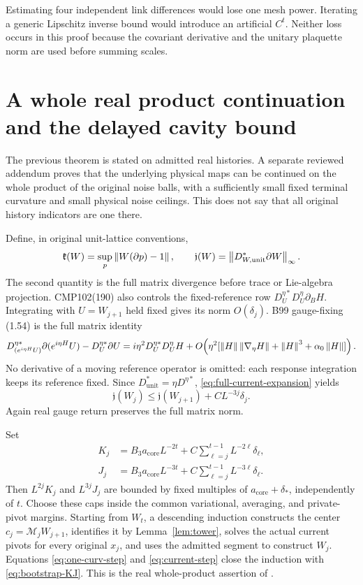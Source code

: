 Estimating four independent link differences would lose one mesh power. Iterating a generic Lipschitz inverse bound would introduce an artificial $C^t$. Neither loss occurs in this proof because the covariant derivative and the unitary plaquette norm are used before summing scales.

\section{A whole real product continuation and the delayed cavity bound}
\label{sec:whole-product}

The previous theorem is stated on admitted real histories. A separate reviewed addendum proves that the underlying physical maps can be continued on the whole product of the original noise balls, with a sufficiently small fixed terminal curvature and small physical noise ceilings. This does not say that all original history indicators are one there.

Define, in original unit-lattice conventions,
\[
 \mathfrak k(W)=\sup_p\left\lVert W(\partial p)-1\right\rVert,\qquad
 \mathfrak j(W)=\left\lVert D_{W,\mathrm{unit}}^*\partial W\right\rVert_\infty.
\]
The second quantity is the full matrix divergence before trace or Lie-algebra projection. CMP102(190) also controls the fixed-reference row
$D_U^{\eta *}D_U^\eta\partial_BH$. Integrating with $U=W_{j+1}$ held fixed gives its norm $O(\delta_j)$. B99 gauge-fixing (1.54) is the full matrix identity
\begin{equation}\label{eq:full-current-expansion}
 D_{(e^{i\eta H}U)}^{\eta *}\partial(e^{i\eta H}U)
 -D_U^{\eta *}\partial U
 =i\eta^2D_U^{\eta *}D_U^\eta H
 +O\!\left(\eta^2[\left\lVert H\right\rVert\left\lVert \nabla_\eta H\right\rVert
                     +\left\lVert H\right\rVert^3+\alpha_0\left\lVert H\right\rVert]\right).
\end{equation}
No derivative of a moving reference operator is omitted: each response integration keeps its reference fixed. Since $D_{\mathrm{unit}}^*=\eta D^{\eta *}$, \eqref{eq:full-current-expansion} yields
\begin{equation}\label{eq:current-step}
 \mathfrak j(W_j)\le\mathfrak j(W_{j+1})+CL^{-3j}\delta_j.
\end{equation}
Again real gauge return preserves the full matrix norm.

Set
\begin{align}\label{eq:bootstrap-KJ}
 K_j&=B_3a_{\mathrm{core}}L^{-2t}
                +C\sum_{\ell=j}^{t-1}L^{-2\ell}\delta_\ell,\\
 J_j&=B_3a_{\mathrm{core}}L^{-3t}
                +C\sum_{\ell=j}^{t-1}L^{-3\ell}\delta_\ell.\nonumber
\end{align}
Then $L^{2j}K_j$ and $L^{3j}J_j$ are bounded by fixed multiples of $a_{\mathrm{core}}+\delta_*$, independently of $t$. Choose these caps inside the common variational, averaging, and private-pivot margins. Starting from $W_t$, a descending induction constructs the center $c_j=\mathcal M_jW_{j+1}$, identifies it by Lemma~\ref{lem:tower}, solves the actual current pivots for every original $x_j$, and uses the admitted segment to construct $W_j$. Equations \eqref{eq:one-curv-step} and \eqref{eq:current-step} close the induction with \eqref{eq:bootstrap-KJ}. This is the real whole-product assertion of .

